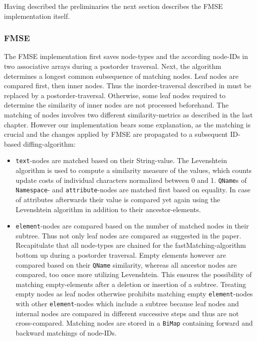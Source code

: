 Having described the preliminaries the next section describes the FMSE implementation itself.

\subsubsection{FMSE} The FMSE implementation first saves node-types and the according node-IDs in two associative arrays during a postorder traversal. Next, the algorithm determines a longest common subsequence of matching nodes. Leaf nodes are compared first, then inner nodes. Thus the inorder-traversal described in \cite{chawathe1996change} must be replaced by a postorder-traversal. Otherwise, some leaf nodes required to determine the similarity of inner nodes are not processed beforehand. The matching of nodes involves two different similarity-metrics as described in the last chapter. However our implementation bears some explanation, as the matching is crucial and the changes applied by FMSE are propagated to a subsequent ID-based diffing-algorithm:

\begin{itemize}
\item \texttt{text}-nodes are matched based on their String-value. The Levenshtein algo\-rithm is used to compute a similarity measure of the values, which counts update costs of individual characters normalized between 0 and 1. \texttt{QName}s of \texttt{Namespace}- and \texttt{attribute}-nodes are matched first based on equality. In case of attributes afterwards their value is compared yet again using the Levenshtein algorithm in addition to their ancestor-elements.

\item \texttt{element}-nodes are compared based on the number of matched nodes in their subtree. Thus not only leaf nodes are compared as suggested in the paper. Recapitulate that all node-types are chained for the fast\-Matching-algorithm bottom up during a postorder traversal. Empty elements however are compared based on their \texttt{QName} similarity, whereas all ancestor nodes are compared, too once more utilizing Levenshtein. This ensures the possibility of matching empty-elements after a deletion or insertion of a subtree. Treating empty nodes as leaf nodes otherwise prohibits matching empty \texttt{element}-nodes with other \texttt{element}-nodes which include a subtree because leaf nodes and internal nodes are compared in different successive steps and thus are not cross-compared. Matching nodes are stored in a \texttt{BiMap} containing forward and backward matchings of node-IDs.
\end{itemize}

